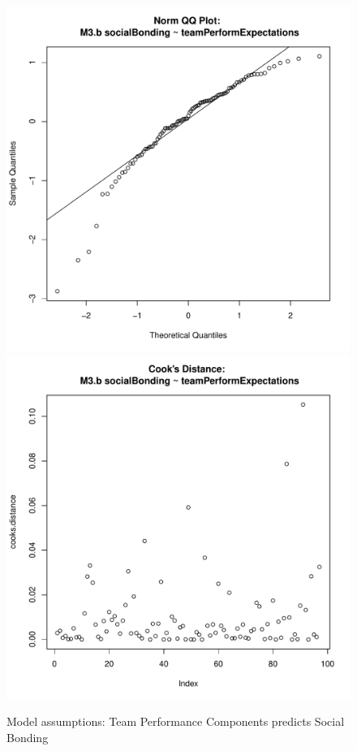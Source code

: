 \begin{figure}[htbp]
        \includegraphics[scale =.4]{images/MLM3bQQNorm.pdf}
        \includegraphics[scale =.4]{images/MLM3bCooksD.pdf}
        \caption{Model assumptions: Team Performance Components predicts Social Bonding }
        \label{fig:MLM3bAssumptions}
      \end{figure}


